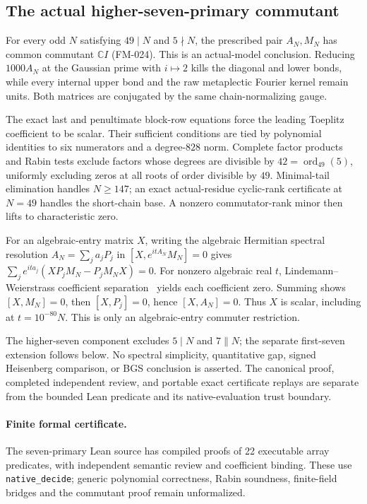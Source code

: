 \subsection{The actual higher-seven-primary commutant}
\label{sec:actual-seven-primary-commutant}
For every odd $N$ satisfying $49\mid N$ and $5\nmid N$, the prescribed
pair $A_N,M_N$ has common commutant $\mathbb C I$ (FM-024).
This is an actual-model conclusion. Reducing $1000A_N$ at the Gaussian
prime with $i\mapsto2$ kills the diagonal and lower bonds, while every
internal upper bond and the raw metaplectic Fourier kernel remain units.
Both matrices are conjugated by the same chain-normalizing gauge.

The exact last and penultimate block-row equations force the leading
Toeplitz coefficient to be scalar. Their sufficient conditions are tied
by polynomial identities to six numerators and a degree-$828$ norm.
Complete factor products and Rabin tests exclude factors whose degrees
are divisible by $42=\operatorname{ord}_{49}(5)$, uniformly excluding
zeros at all roots of order divisible by $49$. Minimal-tail elimination
handles $N\ge147$; an exact actual-residue cyclic-rank certificate at
$N=49$ handles the short-chain base. A nonzero commutator-rank minor
then lifts to characteristic zero.

For an algebraic-entry matrix $X$, writing the algebraic Hermitian
spectral resolution $A_N=\sum_j a_jP_j$ in
$[X,e^{itA_N}M_N]=0$ gives
$\sum_j e^{ita_j}(XP_jM_N-P_jM_NX)=0$.
For nonzero algebraic real $t$, Lindemann--Weierstrass coefficient
separation~\cite{Popescu2023} yields each coefficient zero. Summing shows $[X,M_N]=0$,
then $[X,P_j]=0$, hence $[X,A_N]=0$. Thus $X$ is scalar, including at
$t=10^{-80}N$. This is only an algebraic-entry commuter restriction.

The higher-seven component excludes $5\mid N$ and $7\parallel N$; the separate first-seven extension follows below. No spectral
simplicity, quantitative gap, signed Heisenberg comparison, or BGS
conclusion is asserted. The canonical proof, completed independent
review, and portable exact certificate replays are separate from the
bounded Lean predicate and its native-evaluation trust boundary.

\paragraph{Finite formal certificate.} The seven-primary Lean source has compiled proofs of 22 executable array predicates, with independent semantic review and coefficient binding. These use \texttt{native\_decide}; generic polynomial correctness, Rabin soundness, finite-field bridges and the commutant proof remain unformalized.

